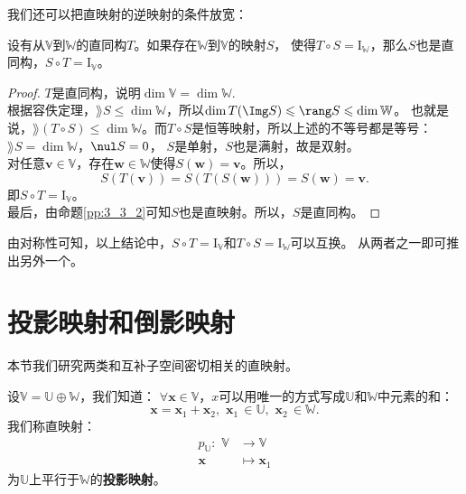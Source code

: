 \documentclass[12pt,UTF8,fontset=none]{ctexbook}
\begin{document}
我们还可以把直映射的逆映射的条件放宽：
\begin{pp}\label{pp:3_3_3}
    设有从$\mathbb{V}$到$\mathbb{W}$的直同构$T$。如果存在$\mathbb{W}$到$\mathbb{V}$的映射$S$，
    使得$T\circ S = \mathrm{I}_{\mathbb{W}}$，那么$S$也是直同构，$S\circ T = \mathrm{I}_{\mathbb{V}}$。
\end{pp}
\begin{proof} %
    $T$是直同构，说明$\dim \mathbb{V} = \dim \mathbb{W}$.\\
    根据容佚定理，$\rang S \leqslant \dim \mathbb{W}$，所以$\dim T(\Img S) \leqslant \rang S \leqslant \dim \mathbb{W}$。
    也就是说，$\rang (T\circ S) \leqslant \dim \mathbb{W}$。而$T\circ S$是恒等映射，所以上述的不等号都是等号：$\rang S = \dim \mathbb{W}$，$\nul S = 0$，
    $S$是单射，$S$也是满射，故是双射。\\
    对任意$\mathbf{v} \in \mathbb{V}$，存在$\mathbf{w} \in \mathbb{W}$使得$S(\mathbf{w}) = \mathbf{v}$。所以，
    $$ S(T(\mathbf{v})) = S(T(S(\mathbf{w}))) = S(\mathbf{w}) = \mathbf{v}. $$
    即$S\circ T = \mathrm{I}_{\mathbb{V}}$。\\
    最后，由命题\ref{pp:3_3_2}可知$S$也是直映射。所以，$S$是直同构。

\end{proof}


由对称性可知，以上结论中，$S\circ T = \mathrm{I}_{\mathbb{V}}$和$T\circ S = \mathrm{I}_{\mathbb{W}}$可以互换。
从两者之一即可推出另外一个。

\section{投影映射和倒影映射}

本节我们研究两类和互补子空间密切相关的直映射。
\begin{df}\label{df:3_2}
    设$\mathbb{V} = \mathbb{U} \oplus \mathbb{W}$，我们知道：
    $\forall \mathbf{x}\in \mathbb{V}$，$x$可以用唯一的方式写成$\mathbb{U}$和$\mathbb{W}$中元素的和：
    $$ \mathbf{x} = \mathbf{x}_1 + \mathbf{x}_2, \,\,\mathbf{x}_1\,\in\mathbb{U},\,\,\mathbf{x}_2\,\in\mathbb{W}.$$
    我们称直映射：
    \begin{align*}
        p_{\mathbb{U}}: \,\, \mathbb{V} & \to \mathbb{V}  \\
        \mathbf{x} & \mapsto \mathbf{x}_1 
    \end{align*}    
    为$\mathbb{U}$上平行于$\mathbb{W}$的\textbf{投影映射}。
\end{df}
\end{document}
